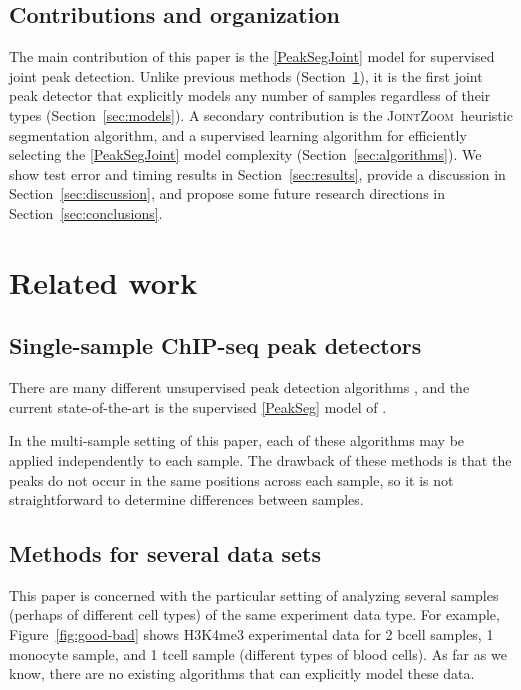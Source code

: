 \documentclass{article} %
\newcommand{\JointHeuristic}{\textsc{JointZoom}}
\begin{document}
\subsection{Contributions and organization}

The main contribution of this paper is the \ref{PeakSegJoint} model
for supervised joint peak detection. Unlike previous methods
(Section~\ref{sec:related}), it is the first joint peak detector that
explicitly models any number of samples regardless of their types
(Section~\ref{sec:models}). A secondary contribution is the
\JointHeuristic\ heuristic segmentation algorithm, and a supervised
learning algorithm for efficiently selecting the \ref{PeakSegJoint}
model complexity (Section~\ref{sec:algorithms}).  We show test error
and timing results in Section~\ref{sec:results}, provide a discussion
in Section~\ref{sec:discussion}, and propose some future research
directions in Section~\ref{sec:conclusions}.

\section{Related work}
\label{sec:related}

\subsection{Single-sample ChIP-seq peak detectors}

There are many different unsupervised peak detection algorithms
\citep{evaluation2010, rye2010manually, chip-seq-bench}, and the
current state-of-the-art is the supervised \ref{PeakSeg} model of
\citet{HOCKING-PeakSeg}. 

In the multi-sample setting of this paper, each of these algorithms
may be applied independently to each sample. The drawback of these
methods is that the peaks do not occur in the same positions across
each sample, so it is not straightforward to determine differences
between samples.

\subsection{Methods for several data sets}

This paper is concerned with the particular setting of analyzing
several samples (perhaps of different cell types) of the same
experiment data type. For example, Figure~\ref{fig:good-bad} shows
H3K4me3 experimental data for 2 bcell samples, 1 monocyte sample, and
1 tcell sample (different types of blood cells). As far as we know,
there are no existing algorithms that can explicitly model these data.
\end{document}

